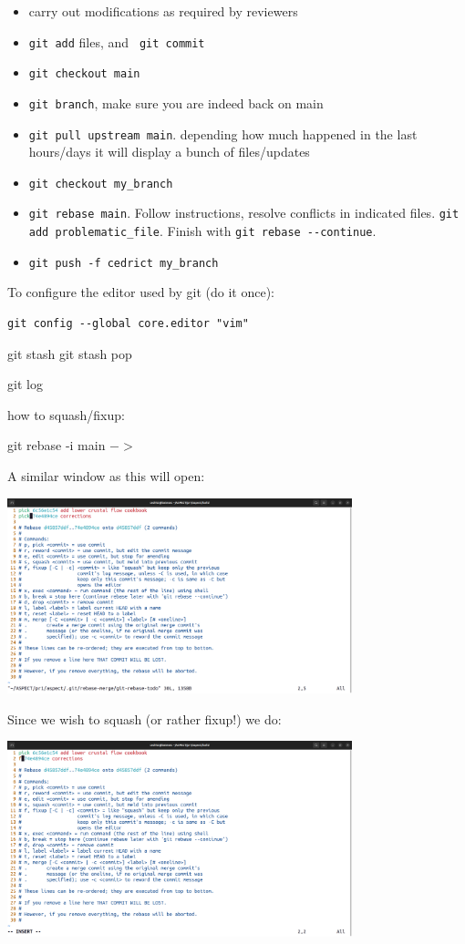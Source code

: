 \begin{itemize}
\item carry out modifications as required by reviewers
\item \verb'git add' files, and \verb' git commit'
\item \verb'git checkout main'
\item \verb'git branch', make sure you are indeed back on main
\item \verb'git pull upstream main'. depending how much happened in the last hours/days it will display a bunch of files/updates
\item \verb'git checkout my_branch'
\item \verb'git rebase main'. Follow instructions, resolve conflicts in indicated files. 
\verb'git add problematic_file'. 
Finish with \verb'git rebase --continue'. 
\item \verb'git push -f cedrict my_branch'
\end{itemize}

To configure the editor used by git (do it once):
\begin{verbatim}
git config --global core.editor "vim"
\end{verbatim}


git stash 
git stash pop


git log


\newpage
how to squash/fixup:

git rebase -i main $->$  

A similar window as this will open:

\begin{center}
\includegraphics[width=10cm]{images/github/aaa}
\end{center}

Since we wish to squash (or rather fixup!) we do:

\begin{center}
\includegraphics[width=10cm]{images/github/bbb}
\end{center}

